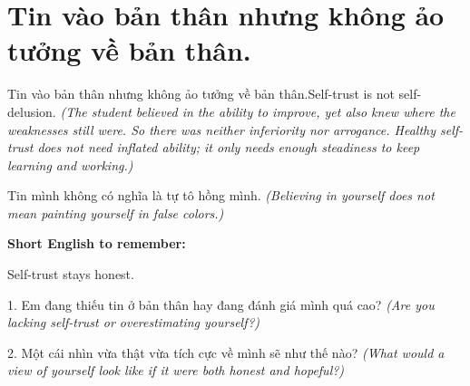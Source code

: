 \section{Tin vào bản thân nhưng không ảo tưởng về bản thân.}
\begin{truyen}{Tin vào bản thân nhưng không ảo tưởng về bản thân.}{Self-trust is not self-delusion.}
\textit{(The student believed in the ability to improve, yet also knew where the weaknesses still were. So there was neither inferiority nor arrogance. Healthy self-trust does not need inflated ability; it only needs enough steadiness to keep learning and working.)}
\end{truyen}
\begin{baihoc}
Tin mình không có nghĩa là tự tô hồng mình.
\textit{(Believing in yourself does not mean painting yourself in false colors.)}
\end{baihoc}
\begin{ghinhoanh}
\textbf{Short English to remember:}

Self-trust stays honest.
\end{ghinhoanh}
\begin{tuhocnhanh}
1. Em đang thiếu tin ở bản thân hay đang đánh giá mình quá cao? \textit{(Are you lacking self-trust or overestimating yourself?)}

2. Một cái nhìn vừa thật vừa tích cực về mình sẽ như thế nào? \textit{(What would a view of yourself look like if it were both honest and hopeful?)}
\end{tuhocnhanh}
\ngancach

